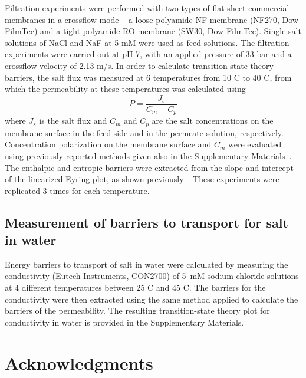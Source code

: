 \documentclass[12pt]{article}
\begin{document}
Filtration experiments were performed with two types of flat-sheet commercial membranes in a crossflow mode -- a loose polyamide NF membrane (NF270, Dow FilmTec) and a tight polyamide RO membrane (SW30, Dow FilmTec). Single-salt solutions of NaCl and NaF at 5 mM were used as feed solutions. The filtration experiments were carried out at pH 7, with an applied pressure of 33 bar and a crossflow velocity of 2.13 m/s. In order to calculate transition-state theory barriers, the salt flux was measured at 6 temperatures from 10 \textdegree C to 40 \textdegree C, from which the permeability at these temperatures was calculated using
\begin{equation}
    P = \frac{J_s}{C_m - C_p}
    \label{eq:experimental_permeability}
\end{equation}
\noindent where $J_s$ is the salt flux and $C_m$ and $C_p$ are the salt concentrations on the membrane surface in the feed side and in the permeate solution, respectively. Concentration polarization on the membrane surface and $C_m$ were evaluated using previously reported methods given also in the Supplementary Materials~\cite{peer-haim_adverse_2023}. The enthalpic and entropic barriers were extracted from the slope and intercept of the linearized Eyring plot, as shown previously~\cite{shefer_limited_2022}. These experiments were replicated 3 times for each temperature.

\subsection*{Measurement of barriers to transport for salt in water}

Energy barriers to transport of salt in water were calculated by measuring the conductivity (Eutech Instruments, CON2700) of 5~mM sodium chloride solutions at 4 different temperatures between 25 \textdegree C and 45 \textdegree C. The barriers for the conductivity were then extracted using the same method applied to calculate the barriers of the permeability. The resulting transition-state theory plot for conductivity in water is provided in the Supplementary Materials.

\clearpage
\pagebreak



\section*{Acknowledgments}
\end{document}
